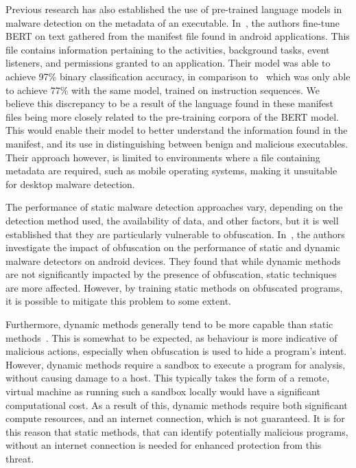 \documentclass{report}
\begin{document}
Previous research has also established the use of pre-trained language models in malware detection on the metadata of an executable. In~\cite{rahaliMalBERTMalwareDetection2021}, the authors fine-tune BERT on text gathered from the manifest file found in android applications. This file contains information pertaining to the activities, background tasks, event listeners, and permissions granted to an application. Their model was able to achieve 97\% binary classification accuracy, in comparison to~\citep{demirciStaticMalwareDetection2022} which was only able to achieve 77\% with the same model, trained on instruction sequences. We believe this discrepancy to be a result of the language found in these manifest files being more closely related to the pre-training corpora of the BERT model. This would enable their model to better understand the information found in the manifest, and its use in distinguishing between benign and malicious executables. Their approach however, is limited to environments where a file containing metadata are required, such as mobile operating systems, making it unsuitable for desktop malware detection. 

The performance of static malware detection approaches vary, depending on the detection method used, the availability of data, and other factors, but it is well established that they are particularly vulnerable to obfuscation. In~\cite{bacciImpactCodeObfuscation2018}, the authors investigate the impact of obfuscation on the performance of static and dynamic malware detectors on android devices. They found that while dynamic methods are not significantly impacted by the presence of obfuscation, static techniques are more affected. However, by training static methods on obfuscated programs, it is possible to mitigate this problem to some extent. 

Furthermore, dynamic methods generally tend to be more capable than static methods~\citep{damodaranComparisonStaticDynamic2017}. This is somewhat to be expected, as behaviour is more indicative of malicious actions, especially when obfuscation is used to hide a program's intent. However, dynamic methods require a sandbox to execute a program for analysis, without causing damage to a host. This typically takes the form of a remote, virtual machine as running such a sandbox locally would have a significant computational cost. As a result of this, dynamic methods require both significant compute resources, and an internet connection, which is not guaranteed. It is for this reason that static methods, that can identify potentially malicious programs, without an internet connection is needed for enhanced protection from this threat. 
\end{document}

